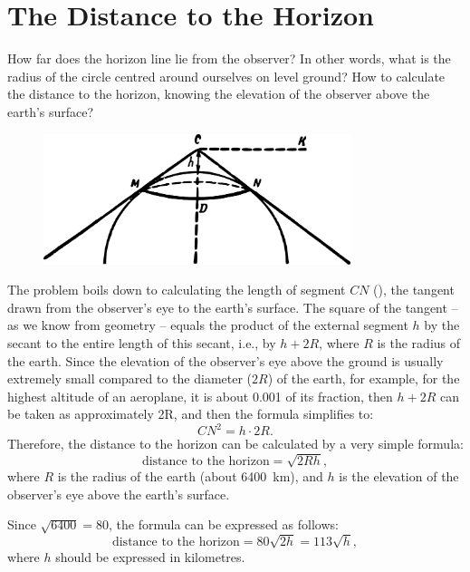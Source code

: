 \section{The Distance to the Horizon}
\label{sec-6.3}

How far does the horizon line lie from the observer? In other words, what is the radius of the circle centred around ourselves on level ground? How to calculate the distance to the horizon, knowing the elevation of the observer above the earth's surface?

\begin{figure}[h!]
\centering
\includegraphics[width=0.8\textwidth]{figures/ch-06/fig-103.pdf}
\end{figure}

The problem boils down to calculating the length of segment $CN$ (), the tangent drawn from the observer's eye to the earth's surface. The square of the tangent -- as we know from geometry -- equals the product of the external segment $h$ by the secant to the entire length of this secant, i.e., by $h + 2R$, where $R$ is the radius of the earth. Since the elevation of the observer's eye above the ground is usually extremely small compared to the diameter ($2R$) of the earth, for example, for the highest altitude of an aeroplane, it is about 0.001 of its fraction, then $h + 2R$  can be taken as approximately 2R, and then the formula simplifies to:
\begin{equation*}%
CN^{2} = h \cdot 2R.
\end{equation*}
Therefore, the distance to the horizon can be calculated by a very simple formula:
\begin{equation*}%
\text{distance to the horizon} = \sqrt{2Rh},
\end{equation*}
where $R$ is the radius of the earth (about \SI{6400}{\kilo\meter}), and $h$ is the elevation of the observer's eye above the earth's surface.

Since $\sqrt{6400} = 80$, the formula can be expressed as follows:
\begin{equation*}%
\text{distance to the horizon} = 80\sqrt{2h} = 113\sqrt{h},
\end{equation*}
where $h$ should be expressed in kilometres.

